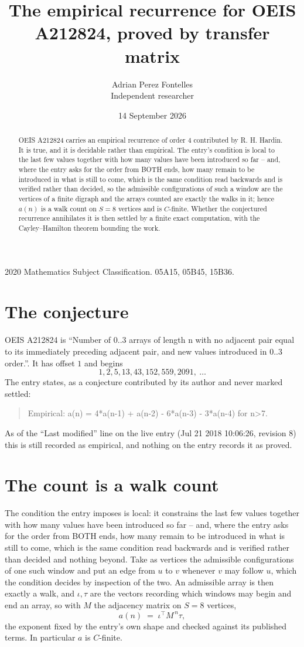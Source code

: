 \documentclass[11pt,a4paper]{article}
\title{The empirical recurrence for OEIS A212824, proved by transfer matrix}
\author{Adrian Perez Fontelles\\ \small Independent researcher}
\date{14 September 2026}
\theoremstyle{plain}
\theoremstyle{definition}
\begin{document}
\maketitle

\begin{abstract}
OEIS A212824 carries an empirical recurrence of order $4$ contributed by R. H. Hardin. It is
true, and it is decidable rather than empirical. The entry's condition is local to the last few values together with how many values have been introduced so far -- and, where the entry asks for the order from BOTH ends, how many remain to be introduced in what is still to come, which is the same condition read backwards and is verified rather than decided, so
the admissible configurations of such a window are the vertices of a finite digraph and the
arrays counted are exactly the walks in it; hence $a(n)$ is a walk count on $S=8$ vertices
and is $C$-finite. Whether the conjectured recurrence annihilates it is then settled by a
finite exact computation, with the Cayley--Hamilton theorem bounding the work.
\end{abstract}

\noindent\small 2020 Mathematics Subject Classification. 05A15, 05B45, 15B36.\normalsize

\section{The conjecture}

OEIS A212824 is ``Number of 0..3 arrays of length n with no adjacent pair equal to its immediately preceding adjacent pair, and new values introduced in 0..3 order.''. It has offset $1$ and begins
\[
1, 2, 5, 13, 43, 152, 559, 2091,\ \dots
\]
The entry states, as a conjecture contributed by its author and never marked settled:
\begin{quote}
Empirical: a(n) = 4*a(n-1) + a(n-2) - 6*a(n-3) - 3*a(n-4) for n>7.
\end{quote}
As of the ``Last modified'' line on the live entry (Jul 21 2018 10:06:26, revision 8) this is still
recorded as empirical, and nothing on the entry records it as proved.

\section{The count is a walk count}

The condition the entry imposes is local: it constrains the last few values together with how many values have been introduced so far -- and, where the entry asks for the order from BOTH ends, how many remain to be introduced in what is still to come, which is the same condition read backwards and is verified rather than decided and nothing beyond. Take as vertices the admissible configurations of one such window and put an edge from $u$ to $v$ whenever $v$ may follow $u$, which the condition decides by inspection of the two.
An admissible array is then exactly a walk, and $\iota,\tau$ are the vectors recording which windows may begin and end an array, so with $M$ the adjacency matrix on $S=8$ vertices,
\[
a(n)\;=\;\iota^{\!\top}M^{\,n}\tau ,
\]
the exponent fixed by the entry's own shape and checked against its published terms. In
particular $a$ is $C$-finite.
\end{document}
